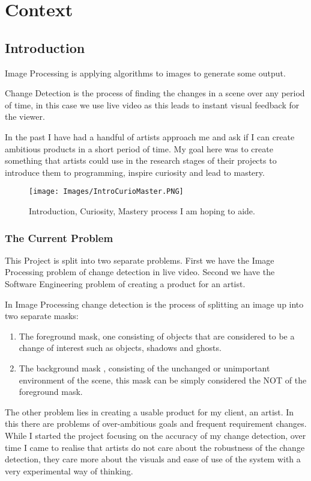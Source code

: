 \documentclass[a4paper]{report}
\begin{document}
\tableofcontents
\clearpage

\chapter{Context}
\section{Introduction}
Image Processing is applying algorithms to images to generate some output.

Change Detection is the process of finding the changes in a scene over any period of time, in this case we use live video as this leads to instant visual feedback for the viewer.

In the past I have had a handful of artists approach me and ask if I can create ambitious products in a short period of time. My goal here was to create something that artists could use in the research stages of their projects to introduce them to programming, inspire curiosity and lead to mastery.

\begin{figure}
\centering
\texttt{[image: Images/IntroCurioMaster.PNG]}
\caption{\label{fig:Introduction, Curiosity, Mastery process} Introduction, Curiosity, Mastery process I am hoping to aide.}
\end{figure}

\subsection{The Current Problem}
This Project is split into two separate problems. First we have the Image Processing problem of change detection in live video. Second we have the Software Engineering problem of creating a product for an artist.

In Image Processing change detection is the process of splitting an image up into two separate masks:
\begin{enumerate}
  \item The foreground mask, one consisting of objects that are considered to be a change of interest such as objects, shadows and ghosts.
  \item The background mask , consisting of the unchanged or unimportant environment of the scene, this mask can be simply considered the NOT of the foreground mask.
\end{enumerate}

The other problem lies in creating a usable product for my client, an artist. In this there are problems of over-ambitious goals and frequent requirement changes. While I started the project focusing on the accuracy of my change detection, over time I came to realise that artists do not care about the robustness of the change detection, they care more about the visuals and ease of use of the system with a very experimental way of thinking.
\end{document}
